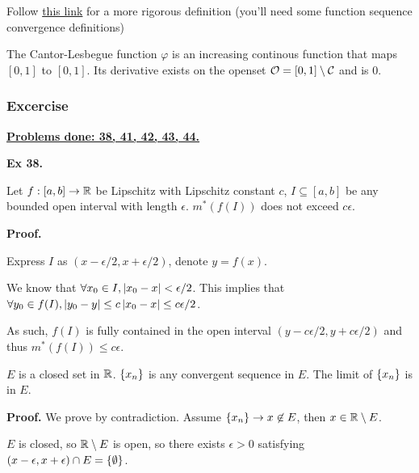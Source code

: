 \begin{defn}
    Follow \href{https://www.math.purdue.edu/~torresm/lecture-notes/lebesgue-theory/lebesgue-lecture16.pdf}{this link} 
    for a more rigorous definition (you'll need some function sequence convergence definitions)
\end{defn}

\begin{prop}
    The Cantor-Lesbegue function $\varphi$ is an increasing continous function that maps $[0,1]$ to $[0,1]$.
    Its derivative exists on the openset $\mathcal{O} = [0,1]\setminus \mathcal{C}$ and is 0.
\end{prop}

\subsubsection{Excercise}
\underline{\textbf{Problems done: 38, 41, 42, 43, 44.}}
\bigskip



\noindent {} \textbf{Ex 38.} \label{ex:2_38}
\begin{lem}
    Let $f: [a,b]\to \mathbb{R}$ be Lipschitz with Lipschitz constant $c$, $I \subseteq [a,b]$ be any bounded open interval with length $\epsilon$.
    $m^\ast(f(I))$ does not exceed $c\epsilon$.
\end{lem}
\textbf{Proof.}

Express $I$ as $(x-\epsilon/2, x+\epsilon/2)$, denote $y = f(x)$.

We know that $\forall x_0 \in I, \left|x_0 - x\right| < \epsilon/2$.
This implies that $\forall y_0 \in f(I), \left|y_0 - y\right| \leq c\left|x_0 - x\right| \leq c\epsilon/2$.

As such, $f(I)$ is fully contained in the open interval $(y-c\epsilon/2, y+c\epsilon/2)$ and thus $m^\ast(f(I)) \leq c\epsilon$.


\begin{lem}
    $E$ is a closed set in $\mathbb{R}$. $\left\{x_n\right\}$ is any convergent sequence in $E$.
    The limit of $\left\{x_n\right\}$ is in $E$.
\end{lem}
\textbf{Proof.} We prove by contradiction. Assume $\left\{x_n\right\} \to x \not\in E$, then $x \in \mathbb{R}\setminus E$. 

$E$ is closed, so $\mathbb{R}\setminus E$ is open, so there exists $\epsilon > 0$ satisfying $(x-\epsilon, x+\epsilon) \cap E = \left\{\emptyset\right\}$.

